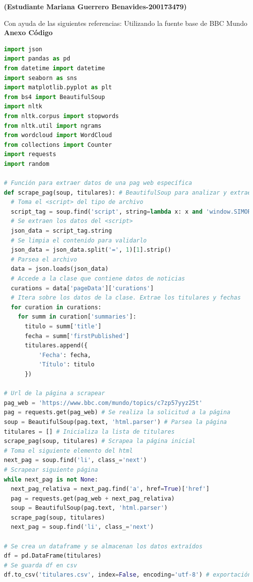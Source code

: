 \newpage
\textbf{(Estudiante Mariana Guerrero Benavides-200173479)}

Con ayuda de las siguientes referencias: \cite{ChatGPT_scrapingScript} \cite{Scraping_web} Utilizando la fuente base de \cite{Usable_link} BBC Mundo \\
\textbf{Anexo Código}
\begin{lstlisting}[language=Python]
import json
import pandas as pd
from datetime import datetime
import seaborn as sns
import matplotlib.pyplot as plt
from bs4 import BeautifulSoup
import nltk
from nltk.corpus import stopwords
from nltk.util import ngrams
from wordcloud import WordCloud
from collections import Counter
import requests
import random

# Función para extraer datos de una pag web específica
def scrape_pag(soup, titulares): # BeautifulSoup para analizar y extraer datos del HTML
  # Toma el <script> del tipo de archivo
  script_tag = soup.find('script', string=lambda x: x and 'window.SIMORGH_DATA' in x)
  # Se extraen los datos del <script>
  json_data = script_tag.string
  # Se limpia el contenido para validarlo
  json_data = json_data.split('=', 1)[1].strip()
  # Parsea el archivo
  data = json.loads(json_data)
  # Accede a la clase que contiene datos de noticias
  curations = data['pageData']['curations']
  # Itera sobre los datos de la clase. Extrae los titulares y fechas
  for curation in curations:
    for summ in curation['summaries']:
      titulo = summ['title']
      fecha = summ['firstPublished']
      titulares.append({
          'Fecha': fecha,
          'Título': titulo
      })

# Url de la página a scrapear
pag_web = 'https://www.bbc.com/mundo/topics/c7zp57yyz25t'
pag = requests.get(pag_web) # Se realiza la solicitud a la página
soup = BeautifulSoup(pag.text, 'html.parser') # Parsea la página
titulares = [] # Inicializa la lista de titulares
scrape_pag(soup, titulares) # Scrapea la página inicial
# Toma el siguiente elemento del html
next_pag = soup.find('li', class_='next')
# Scrapear siguiente página
while next_pag is not None:
  next_pag_relativa = next_pag.find('a', href=True)['href']
  pag = requests.get(pag_web + next_pag_relativa)
  soup = BeautifulSoup(pag.text, 'html.parser')
  scrape_pag(soup, titulares)
  next_pag = soup.find('li', class_='next')

# Se crea un dataframe y se almacenan los datos extraídos
df = pd.DataFrame(titulares)
# Se guarda df en csv
df.to_csv('titulares.csv', index=False, encoding='utf-8') # exportación a csv


\end{lstlisting}
